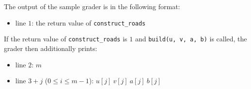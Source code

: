 The output of the sample grader is in the following format:
\begin{itemize}
\item line $1$: the return value of  \texttt{construct\_roads}
\end{itemize}

If the return value of \texttt{construct\_roads} is $1$ and \texttt{build(u, v, a, b)} is called, the grader then
additionally prints:

\begin{itemize}
\item line $2$: $m$
\item line $3+j$ ($0 \leq i \leq m - 1$): $u[j]\ v[j]\ a[j]\ b[j]$
\end{itemize}
